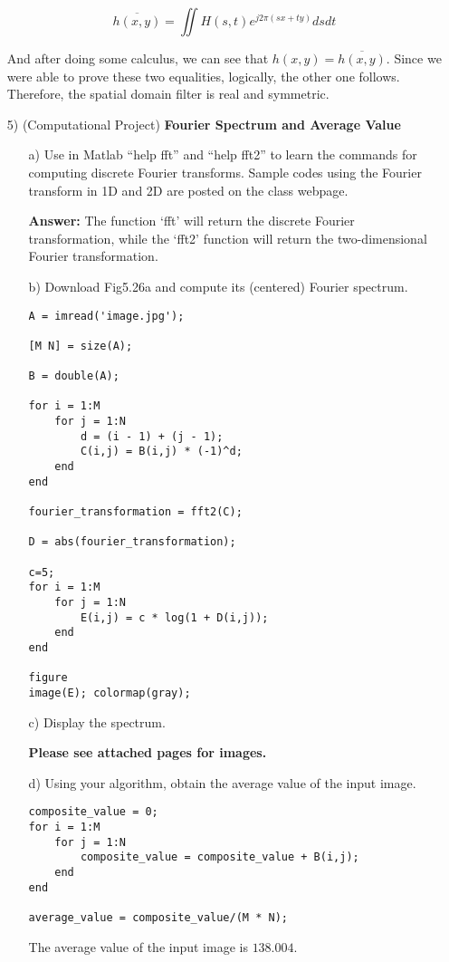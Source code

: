 \documentclass{article}
\begin{document}
\begin{enumerate}
\begin{equation}
\overline{h(x,y)} = \iint H(s, t) e^{j2\pi (sx + ty)} ds dt
\end{equation}

And after doing some calculus, we can see that $h(x,y) = \overline{h(x,y)}$.  Since we were able to prove these two equalities, logically, the other one follows.  Therefore,
the spatial domain filter is real and symmetric.

\newpage
\item[5)] (Computational Project) {\bf Fourier Spectrum and Average Value}

\begin{enumerate}
\item[a)] Use in Matlab ``help fft'' and ``help fft2'' to learn the commands for computing discrete Fourier transforms. Sample codes using the Fourier transform in 1D and 2D are posted on the class webpage. 

\textbf{Answer:} The function `fft' will return the discrete Fourier transformation, while the `fft2' function will return the two-dimensional Fourier transformation.

\item[b)] Download Fig5.26a and compute its (centered) Fourier spectrum.

\begin{lstlisting}
A = imread('image.jpg');

[M N] = size(A);

B = double(A);

for i = 1:M
    for j = 1:N
        d = (i - 1) + (j - 1);
        C(i,j) = B(i,j) * (-1)^d;
    end
end

fourier_transformation = fft2(C);

D = abs(fourier_transformation);

c=5; 
for i = 1:M
    for j = 1:N
        E(i,j) = c * log(1 + D(i,j));
    end
end

figure
image(E); colormap(gray);
\end{lstlisting}

\item[c)] Display the spectrum.

\textbf{Please see attached pages for images.}

\item[d)] Using your algorithm, obtain the average value of the input image.
\begin{lstlisting}
composite_value = 0;
for i = 1:M
    for j = 1:N
        composite_value = composite_value + B(i,j);
    end
end

average_value = composite_value/(M * N);

\end{lstlisting}
The average value of the input image is $138.004$.
\end{enumerate}

\end{enumerate}
\end{document}
